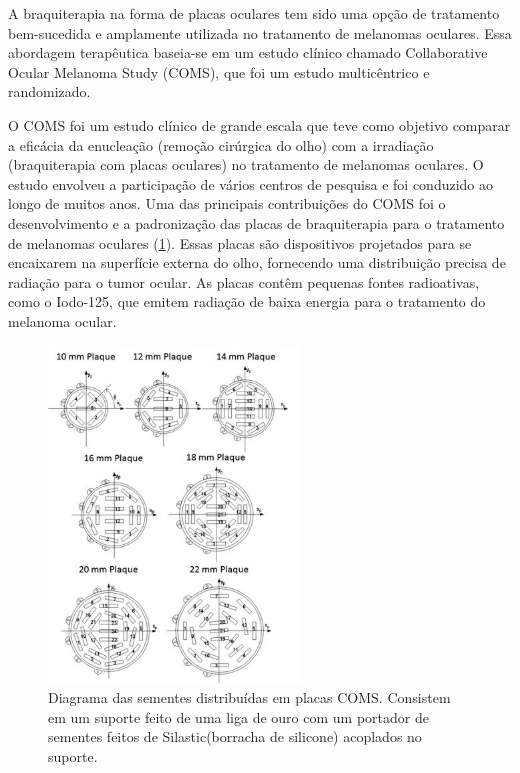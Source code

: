 \documentclass[11pt,a4paper]{article}
\begin{document}
    A braquiterapia na forma de placas oculares tem sido uma opção de tratamento bem-sucedida e amplamente utilizada no tratamento de melanomas oculares. Essa abordagem terapêutica baseia-se em um estudo clínico chamado Collaborative Ocular Melanoma Study (COMS), que foi um estudo multicêntrico e randomizado.

    O COMS foi um estudo clínico de grande escala que teve como objetivo comparar a eficácia da enucleação (remoção cirúrgica do olho) com a irradiação (braquiterapia com placas oculares) no tratamento de melanomas oculares. O estudo envolveu a participação de vários centros de pesquisa e foi conduzido ao longo de muitos anos. Uma das principais contribuições do COMS foi o desenvolvimento e a padronização das placas de braquiterapia para o tratamento de melanomas oculares (\ref{fig:coms}). Essas placas são dispositivos projetados para se encaixarem na superfície externa do olho, fornecendo uma distribuição precisa de radiação para o tumor ocular. As placas contêm pequenas fontes radioativas, como o Iodo-125, que emitem radiação de baixa energia para o tratamento do melanoma ocular.

    \begin{figure}[h]
        \centering
        \includegraphics[width=0.6\textwidth]{Imagens/placasComs.JPG}
        \caption{Diagrama das sementes distribuídas em placas COMS. Consistem em um suporte feito de uma liga de ouro com um portador de sementes feitos de Silastic(borracha de silicone) acoplados no suporte.}
        \label{fig:coms}
    \end{figure}
\end{document}
